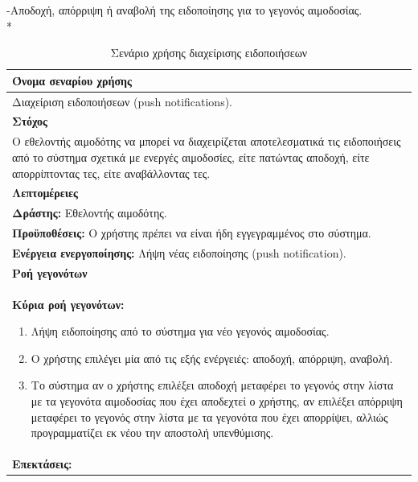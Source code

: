 \newpage
-Αποδοχή, απόρριψη ή αναβολή της ειδοποίησης για το γεγονός αιμοδοσίας.
\\*
\begin{table}[H]
	\begin{center}
	    \begin{tabular}{|p{\dimexpr \linewidth-2\tabcolsep}|}
	    \hline
	    \rowcolor{grayy}
	    \textbf{Όνομα σεναρίου χρήσης}
	    \\ \hline    
	     Διαχείριση ειδοποιήσεων (push notifications).
	     \\ \hline
	    \rowcolor{grayy}
	    \textbf{\textbf{Στόχος}}
	    \\ \hline
	 	 Ο εθελοντής αιμοδότης να μπορεί να διαχειρίζεται αποτελεσματικά τις ειδοποιήσεις από το σύστημα σχετικά με ενεργές αιμοδοσίες, είτε πατώντας αποδοχή,  είτε απορρίπτοντας τες, είτε αναβάλλοντας τες.
	    \\ \hline
	    \rowcolor{grayy}
	    \textbf{Λεπτομέρειες}
	    \\ \hline
		\textbf{Δράστης:} Εθελοντής αιμοδότης.
		\\*
		\textbf{Προϋποθέσεις:} Ο χρήστης πρέπει να είναι ήδη εγγεγραμμένος στο σύστημα.
		\\*
		\textbf{Ενέργεια ενεργοποίησης:} Λήψη νέας ειδοποίησης (push notification).
		\\ \hline
		\rowcolor{grayy}    
	    \textbf{Ροή γεγονότων}
	    \\ \hline
		\textbf{Κύρια ροή γεγονότων:}
		\begin{enumerate}
		
			\item	Λήψη ειδοποίησης από το σύστημα για νέο γεγονός αιμοδοσίας.
			\item  Ο χρήστης επιλέγει μία από τις εξής ενέργειές: αποδοχή, απόρριψη, αναβολή.
			\item Το σύστημα αν ο χρήστης επιλέξει αποδοχή μεταφέρει το γεγονός στην λίστα με τα γεγονότα αιμοδοσίας που έχει αποδεχτεί ο χρήστης, αν επιλέξει απόρριψη μεταφέρει το γεγονός στην λίστα με τα γεγονότα που έχει απορρίψει, αλλιώς προγραμματίζει εκ νέου την αποστολή υπενθύμισης.

		\end{enumerate}
		\\ \hline
		\rowcolor{grayy}
		\textbf{Επεκτάσεις:}
		   \\ \hline
	    \end{tabular}
	    \caption{Σενάριο χρήσης διαχείρισης ειδοποιήσεων}
	    \label{tab:manage_notifcations} 
	\end{center}		
\end{table}			
			
